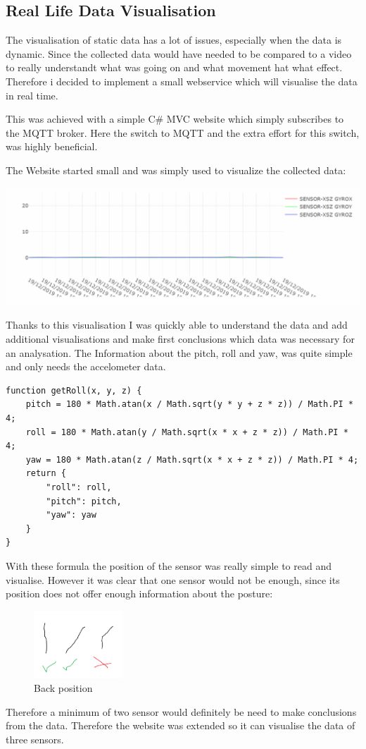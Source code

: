 \subsection{Real Life Data Visualisation}

The visualisation of static data has a lot of issues, especially when the data is dynamic. Since the collected data would have needed to be compared to a video to really understandt what was going on and what movement hat what effect. Therefore i decided to implement a small webservice which will visualise the data in real time. 

This was achieved with a simple C# MVC website which simply subscribes to the MQTT broker. Here the switch to MQTT and the extra effort for this switch, was highly beneficial.

The Website started small and was simply used to visualize the collected data:

\includegraphics[width=\linewidth]{images/WebVisualisation_SIMPLE.png}

Thanks to this visualisation I was quickly able to understand the data and add additional visualisations and make first conclusions which data was necessary for an analysation.
The Information about the pitch, roll and yaw, was quite simple and only needs the accelometer data.

\begin{lstlisting}
function getRoll(x, y, z) {
    pitch = 180 * Math.atan(x / Math.sqrt(y * y + z * z)) / Math.PI * 4;
    roll = 180 * Math.atan(y / Math.sqrt(x * x + z * z)) / Math.PI * 4;
    yaw = 180 * Math.atan(z / Math.sqrt(x * x + z * z)) / Math.PI * 4;
    return {
        "roll": roll,
        "pitch": pitch,
        "yaw": yaw
    }
}
\end{lstlisting}

With these formula the position of the sensor was really simple to read and visualise. However it was clear that one sensor would not be enough, since its position does not offer enough information about the posture: 

\begin{figure}
  \begin{center}
\includegraphics[width=0.3\textwidth]{images/Backposition.png}
  \end{center}
  \caption{Back position}
  \label{fig:BackPos}
\end{figure}

Therefore a minimum of two sensor would definitely be need to make conclusions from the data. Therefore the website was extended so it can visualise the data of three sensors.